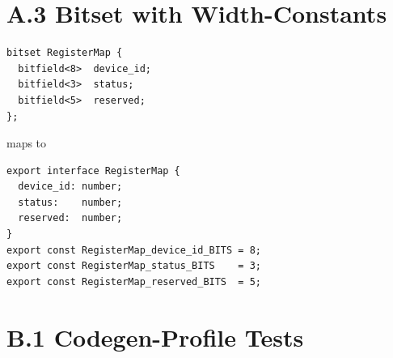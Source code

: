 \documentclass{../styles/zerodds-vendor-spec}
\begin{document}
\section*{A.3 Bitset with Width-Constants}

\begin{lstlisting}
bitset RegisterMap {
  bitfield<8>  device_id;
  bitfield<3>  status;
  bitfield<5>  reserved;
};
\end{lstlisting}
maps to
\begin{lstlisting}
export interface RegisterMap {
  device_id: number;
  status:    number;
  reserved:  number;
}
export const RegisterMap_device_id_BITS = 8;
export const RegisterMap_status_BITS    = 3;
export const RegisterMap_reserved_BITS  = 5;
\end{lstlisting}


\section*{B.1 Codegen-Profile Tests}
\end{document}
